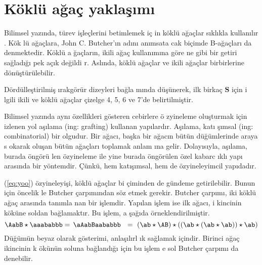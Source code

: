 \documentclass[a4paper,10pt]{article}
\begin{document}
\section{K\"okl\"u a\u{g}a\c{c} yakla\c{s}\i m{\i}}

Bilimsel yaz\i nda, t\"urev i\c{s}le\c{c}lerini betimlemek i\c{c}%
in k\"okl\"u a\u{g}a\c{c}lar s\i kl\i kla kul\-lan\i l\i r 
\cite{Munthe-Kaas2013}. K\"ok%
l\"u a\u{g}a\c{c}lara, John C. Butcher'\i n ad\i n{\i} an\i msata%
cak bi\c{c}imde B-a\u{g}a\c{c}lar{\i} da denmektedir. K\"okl\"u a%
\u{g}a\c{c}lar\i n, ikili a\u{g}a\c{c} kullan\i m\i na g\"ore ne %
gibi bir getiri sa\u{g}lad\i \u{g}{\i} pek a\c{c}\i k de\u{g}ildi%
r. Asl\i nda, k\"okl\"u a\u{g}a\c{c}lar ve ikili a\u{g}a\c{c}lar %
birbirlerine d\"on\"u\c{s}t\"ur\"ulebilir. %

D\"ord\"ulle\c{s}tirilmi\c{s} \i rakg\"or\"ur dizeyleri ba\u{g}la%
m\i nda d\"u\c{s}\"unerek, ilk birka\c{c} $\mathbf{S}$ i\c{c}in i%
lgili ikili ve k\"okl\"u a\u{g}a\c{c}lar \c{c}izelge 4, 5, 6 ve %
7'de belirtilmi\c{s}tir. %

Bilimsel yaz\i nda ayn{\i} \"ozellikleri g\"osteren cebirlere \"o%
zyineleme olu\c{s}turmak i\c{c}in izlenen yol a\c{s}\i lama %
(ing: grafting) kullanan yap\i lard\i r. A\c{s}\i lama, kat{\i}%
\c{s}\i msal (ing: combinatorial) bir olgudur. Bir a\u{g}ac{\i}, %
ba\c{s}ka bir a\u{g}ac\i n b\"ut\"un d\"u\u{g}\"umlerinde araya s%
okarak olu\c{s}an b\"ut\"un a\u{g}a\c{c}lar{\i} toplamak anlam%
{\i}na gelir. Dolay\i s\i yla, a\c{s}\i lama, burada \"ong\"or\"u%
len \"ozyineleme ile yine burada \"ong\"or\"ulen \"ozel kabarc%
\i kl{\i} yap{\i} aras\i nda bir y\"ontemdir. \c{C}\"unk\"u, hem %
kat\i \c{s}\i msal, hem de \"ozyineleyimcil yap{\i}dad\i r. %

(\ref{eq:yoo}) \"ozyineleyi\c{s}i, k\"okl\"u a\u{g}a\c{c}lar bi%
\c{c}iminden de g\"undeme getirilebilir. Bunun i\c{c}in \"oncelik%
le Butcher \c{c}arp{\i}\-m\i n\-dan s\"oz etmek gerekir. Butcher %
\c{c}arp\i m{\i}, iki k\"okl\"u a\u{g}a\c{c} aras\i nda tan\i mla%
nan bir i\c{s}lemdir. Yap\i lan i\c{s}lem ise ilk a\u{g}ac{\i}, i%
kincinin k\"ok\"une soldan ba\u{g}lamakt\i r. Bu i\c{s}lem, a%
\c{s}a\u{g}\i da \"orneklendirilmi\c{s}tir. %
\begin{equation}
 \AabB \star \aaababbb = \, \aAabBaababbb \ \ =\  
 (\ab\star\AB)\star((\ab\star(\ab\star\ab))\star\ab) 
\end{equation}
D\"u\u{g}\"um\"un beyaz olarak g\"osterimi, anla\c{s}\i l\i rl%
\i k sa\u{g}lamak i\c{c}indir. Birinci a\u{g}a\c{c} ikincinin k%
\"ok\"un\"un soluna ba\u{g}land\i \u{g}{\i} i\c{c}in bu i\c{s}lem%
e sol Butcher \c{c}arp\i m{\i} da denebilir. %
\end{document}
